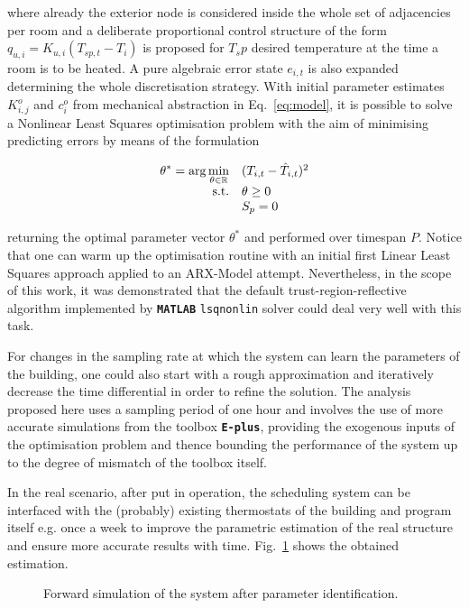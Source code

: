 where already the exterior node is considered inside the whole set of adjacencies per room and a deliberate proportional control structure of the form $q_{u,i}=K_{u,i}(T_{sp,t}-T_i)$ is proposed for $T_sp$ desired temperature at the time a room is to be heated. A pure algebraic error state $e_{i,t}$ is also expanded determining the whole discretisation strategy. 
With initial parameter estimates $K_{i,j}^o$ and $c_{i}^o$ from mechanical abstraction in Eq.~\ref{eq:model}, it is possible to solve a Nonlinear Least Squares optimisation problem with the aim of minimising predicting errors by means of the formulation

\begin{equation}
\begin{array}{rlclcl}
\displaystyle \theta^*=\arg \min_{\theta\in\mathbb{R}} & \multicolumn{3}{l}{(T_{i,t}-\hat{T}_{i,t})^2} \\
\textrm{s.t.} & \theta \geq 0 \\
& S_p = 0\\
\end{array}
\label{eq:opt_k_cluster}
\end{equation}

returning the optimal parameter vector $\theta^*$ and performed over timespan $P$. Notice that one can warm up the optimisation routine with an initial first Linear Least Squares approach applied to an ARX-Model attempt. Nevertheless, in the scope of this work, it was demonstrated that the default trust-region-reflective algorithm implemented by \textbf{\texttt{MATLAB}} \texttt{lsqnonlin} solver could deal very well with this task.

For changes in the sampling rate at which the system can learn the parameters of the building, one could also start with a rough approximation and iteratively decrease the time differential in order to refine the solution. The analysis proposed here uses a sampling period of one hour and involves the use of more accurate simulations from the toolbox \textbf{\texttt{E-plus}}, providing the exogenous inputs of the optimisation problem and thence bounding the performance of the system up to the degree of mismatch of the toolbox itself.

In the real scenario, after put in operation, the scheduling system can be interfaced with the (probably) existing thermostats of the building and program itself e.g. once a week to improve the parametric estimation of the real structure and ensure more accurate results with time. Fig.~\ref{fig:sys_id} shows the obtained estimation.

\begin{figure}[thpb]
	\centering
	\caption{Forward simulation of the system after parameter identification.}
	\label{fig:sys_id}
\end{figure}


